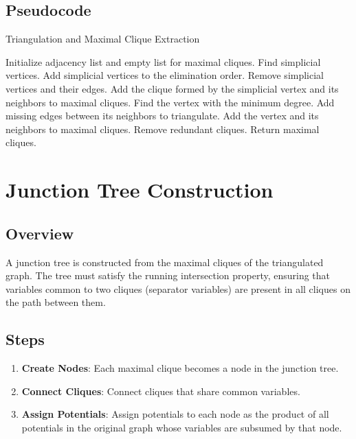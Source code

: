 \documentclass{article}
\begin{document}
\subsection{Pseudocode}
\begin{algorithm}[H]
\caption{Triangulation and Maximal Clique Extraction}
\begin{algorithmic}[1]
\State Initialize adjacency list and empty list for maximal cliques.
    \State Find simplicial vertices.
        \State Add simplicial vertices to the elimination order.
        \State Remove simplicial vertices and their edges.
        \State Add the clique formed by the simplicial vertex and its neighbors to maximal cliques.
    \Else
        \State Find the vertex with the minimum degree.
        \State Add missing edges between its neighbors to triangulate.
        \State Add the vertex and its neighbors to maximal cliques.
    \EndIf
\EndWhile
\State Remove redundant cliques.
\State Return maximal cliques.
\end{algorithmic}
\end{algorithm}

\section{Junction Tree Construction}
\subsection{Overview}
A junction tree is constructed from the maximal cliques of the triangulated graph. The tree must satisfy the running intersection property, ensuring that variables common to two cliques (separator variables) are present in all cliques on the path between them.

\subsection{Steps}
\begin{enumerate}
    \item \textbf{Create Nodes}: Each maximal clique becomes a node in the junction tree.
    \item \textbf{Connect Cliques}: Connect cliques that share common variables.
    \item \textbf{Assign Potentials}: Assign potentials to each node as the product of all potentials in the original graph whose variables are subsumed by that node.
\end{enumerate}
\end{document}
